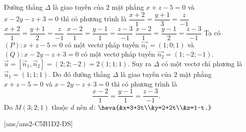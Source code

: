 \begin{ex}%
	Đường thẳng $\Delta$ là giao tuyến của $2$ mặt phẳng $x+z-5=0$ và $x-2y-z+3=0$ thì có phương trình là
	\choice
	{$\dfrac{x+2}{1}=\dfrac{y+1}{3}=\dfrac{z}{-1}$}
	{$\dfrac{x+2}{1}=\dfrac{y+1}{2}=\dfrac{z}{-1}$}
	{\True $\dfrac{x-2}{1}=\dfrac{y-1}{1}=\dfrac{z-3}{-1}$}
	{$\dfrac{x-2}{1}=\dfrac{y-1}{2}=\dfrac{z-3}{-1}$}
	\loigiai
	{
		Ta có $(P)\colon x+z-5=0$ có một vectơ pháp tuyến $\overrightarrow{n_{1}}=(1;0;1)$ và $(Q)\colon x-2y-z+3=0$ có một vectơ pháp tuyến $\overrightarrow{n_{2}}=(1;-2;-1)$.\\
		$\vec{u}=\left[\overrightarrow{n}_{1},\overrightarrow{n}_{2}\right]=(2;2;-2)=2(1;1;1)$.
		Suy ra $\Delta$ có một vectơ chỉ phương là $\vec{u}_{1}=(1;1;1)$.
		Do đó đường thẳng $\Delta$ là giao tuyến của $2$ mặt phẳng $x+z-5=0$ và $x-2y-z+3=0$ thì có phương trình là 
		$$\dfrac{x-2}{1}=\dfrac{y-1}{1}=\dfrac{z-3}{-1}.$$
		Do $M(3;2;1)$ thuộc $d$ nên $d\colon\heva{&x=3+3t\\&y=2+2t\\&z=1-t.}$
	}
\end{ex}
\TNTF
{}[ans/ans2-C5B1D2-DS]
\setcounter{ex}{13}%
